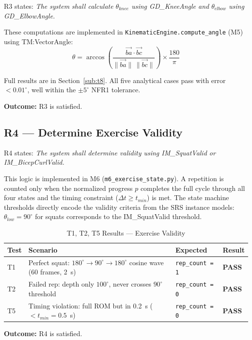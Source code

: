 \documentclass[12pt, titlepage]{article}
\newcommand{\ppass}{\textcolor{green!60!black}{\textbf{PASS}}}
\begin{document}
R3 states: \textit{The system shall calculate $\theta_{knee}$ using
GD\_KneeAngle and $\theta_{elbow}$ using GD\_ElbowAngle.}

These computations are implemented in \texttt{KinematicEngine.compute\_angle}
(M5) using TM:VectorAngle:
\[
  \theta = \arccos\!\left(\frac{\overrightarrow{ba} \cdot
  \overrightarrow{bc}}{\|\overrightarrow{ba}\|\,\|\overrightarrow{bc}\|}
  \right) \times \frac{180}{\pi}
\]

Full results are in Section~\ref{sub:t8}. All five analytical cases pass with
error $< 0.01^\circ$, well within the $\pm 5^\circ$ NFR1 tolerance.

\textbf{Outcome:} R3 is satisfied.

\subsection{R4 --- Determine Exercise Validity}

R4 states: \textit{The system shall determine validity using
IM\_SquatValid or IM\_BicepCurlValid.}

This logic is implemented in M6 (\texttt{m6\_exercise\_state.py}). A
repetition is counted only when the normalized progress $p$ completes the
full cycle through all four states and the timing constraint
($\Delta t \geq t_{min}$) is met. The state machine thresholds directly
encode the validity criteria from the SRS instance models:
$\theta_{low} = 90^\circ$ for squats corresponds to the
IM\_SquatValid threshold.

\begin{table}[H]
\centering
\begin{tabular}{p{1cm} p{7cm} p{2cm} l}
\toprule
\textbf{Test} & \textbf{Scenario} & \textbf{Expected} & \textbf{Result}\\
\midrule
T1 & Perfect squat: $180^\circ \to 90^\circ \to 180^\circ$ cosine wave (60 frames, 2~s) & \texttt{rep\_count = 1} & \ppass \\
T2 & Failed rep: depth only $100^\circ$, never crosses $90^\circ$ threshold & \texttt{rep\_count = 0} & \ppass \\
T5 & Timing violation: full ROM but in 0.2~s ($< t_{min} = 0.5$~s)        & \texttt{rep\_count = 0} & \ppass \\
\bottomrule
\end{tabular}
\caption{T1, T2, T5 Results --- Exercise Validity}
\label{tab:validity}
\end{table}

\textbf{Outcome:} R4 is satisfied.
\end{document}
